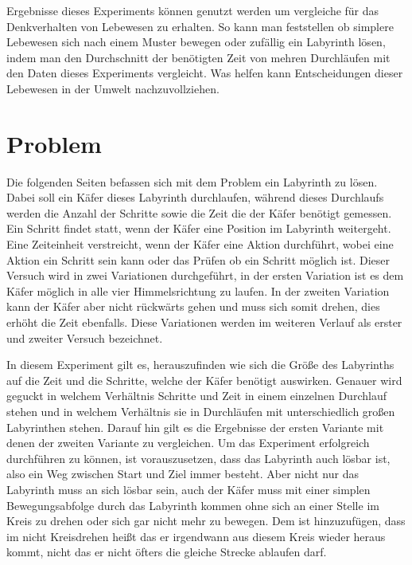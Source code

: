\documentclass[12pt, a4paper, titlepage]{article}
\begin{document}
\bigskip

Ergebnisse dieses Experiments können genutzt werden um vergleiche für das Denkverhalten von Lebewesen zu erhalten.
So kann man feststellen ob simplere Lebewesen sich nach einem Muster bewegen oder zufällig ein Labyrinth lösen, indem man den Durchschnitt der benötigten Zeit von mehren Durchläufen mit den Daten dieses Experiments vergleicht.
Was helfen kann Entscheidungen dieser Lebewesen in der Umwelt nachzuvollziehen.

\newpage

\section{Problem}

Die folgenden Seiten befassen sich mit dem Problem ein Labyrinth zu lösen.
Dabei soll ein Käfer dieses Labyrinth durchlaufen, während dieses Durchlaufs werden die Anzahl der Schritte sowie die Zeit die der Käfer benötigt gemessen.
Ein Schritt findet statt, wenn der Käfer eine Position im Labyrinth weitergeht.
Eine Zeiteinheit verstreicht, wenn der Käfer eine Aktion durchführt, wobei eine Aktion ein Schritt sein kann oder das Prüfen ob ein Schritt möglich ist.
Dieser Versuch wird in zwei Variationen durchgeführt, in der ersten Variation ist es dem Käfer möglich in alle vier Himmelsrichtung zu laufen.
In der zweiten Variation kann der Käfer aber nicht rückwärts gehen und muss sich somit drehen, dies erhöht die Zeit ebenfalls.
Diese Variationen werden im weiteren Verlauf als erster und zweiter Versuch bezeichnet.

\bigskip

In diesem Experiment gilt es, herauszufinden wie sich die Größe des Labyrinths auf die Zeit und die Schritte, welche der Käfer benötigt auswirken.
Genauer wird geguckt in welchem Verhältnis Schritte und Zeit in einem einzelnen Durchlauf stehen und in welchem Verhältnis sie in Durchläufen mit unterschiedlich großen Labyrinthen stehen.
Darauf hin gilt es die Ergebnisse der ersten Variante mit denen der zweiten Variante zu vergleichen.
Um das Experiment erfolgreich durchführen zu können, ist vorauszusetzen, dass das Labyrinth auch lösbar ist, also ein Weg zwischen Start und Ziel immer besteht.
Aber nicht nur das Labyrinth muss an sich lösbar sein, auch der Käfer muss mit einer simplen Bewegungsabfolge durch das Labyrinth kommen ohne sich an einer Stelle im Kreis zu drehen oder sich gar nicht mehr zu bewegen.
Dem ist hinzuzufügen, dass im nicht Kreisdrehen heißt das er irgendwann aus diesem Kreis wieder heraus kommt, nicht das er nicht öfters die gleiche Strecke ablaufen darf.
\end{document}
